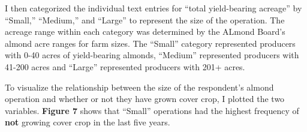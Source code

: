 \documentclass[12pt,]{article}
\newenvironment{Shaded}{\begin{snugshade}}{\end{snugshade}}
\newcommand{\StringTok}[1]{\textcolor[rgb]{0.31,0.60,0.02}{#1}}
\newcommand{\OperatorTok}[1]{\textcolor[rgb]{0.81,0.36,0.00}{\textbf{#1}}}
\newcommand{\NormalTok}[1]{#1}
\begin{document}
I then categorized the individual text entries for ``total yield-bearing
acreage'' by ``Small,'' ``Medium,'' and ``Large'' to represent the size
of the operation. The acreage range within each category was determined
by the ALmond Board's almond acre ranges for farm sizes. The ``Small''
category represented producers with 0-40 acres of yield-bearing almonds,
``Medium'' represented producers with 41-200 acres and ``Large''
represented producers with 201+ acres.

To visualize the relationship between the size of the respondent's
almond operation and whether or not they have grown cover crop, I
plotted the two variables. \textbf{Figure 7} shows that ``Small''
operations had the highest frequency of \textbf{not} growing cover crop
in the last five years.

\begin{Shaded}
\end{Shaded}

  \providecommand{\huxb}[2]{\arrayrulecolor[RGB]{#1}\global\arrayrulewidth=#2pt}
  \providecommand{\huxvb}[2]{\color[RGB]{#1}\vrule width #2pt}
  \providecommand{\huxtpad}[1]{\rule{0pt}{\baselineskip+#1}}
  \providecommand{\huxbpad}[1]{\rule[-#1]{0pt}{#1}}
\end{document}
